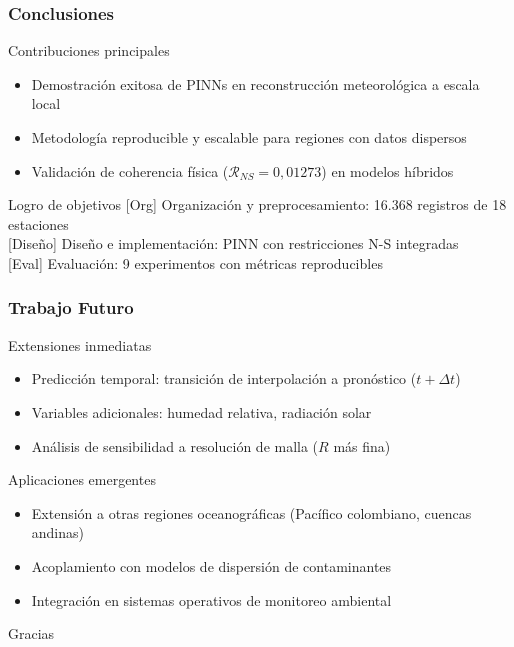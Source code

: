 \begin{frame}[fragile]
  \frametitle{Conclusiones}
  
  \begin{block}{Contribuciones principales}
    \begin{itemize}
      \item \textcolor{ColorVerdeOliva}{Demostración exitosa de PINNs} en reconstrucción meteorológica a escala local
      \item \textcolor{ColorVerdeOliva}{Metodología reproducible y escalable} para regiones con datos dispersos
      \item \textcolor{ColorVerdeOliva}{Validación de coherencia física} ($\mathcal{R}_{NS} = 0,01273$) en modelos híbridos
    \end{itemize}
  \end{block}
  
  \begin{block}{Logro de objetivos}
    \textcolor{ColorVerdeOliva}{[Org]} Organización y preprocesamiento: 16.368 registros de 18 estaciones\\
    \textcolor{ColorVerdeOliva}{[Diseño]} Diseño e implementación: PINN con restricciones N-S integradas\\
    \textcolor{ColorVerdeOliva}{[Eval]} Evaluación: 9 experimentos con métricas reproducibles
  \end{block}
  
\end{frame}

\begin{frame}[fragile]
  \frametitle{Trabajo Futuro}
  
  \begin{block}{Extensiones inmediatas}
    \begin{itemize}
      \item \textcolor{ColorMorado}{Predicción temporal}: transición de interpolación a pronóstico ($t + \Delta t$)
      \item \textcolor{ColorMorado}{Variables adicionales}: humedad relativa, radiación solar
      \item \textcolor{ColorMorado}{Análisis de sensibilidad} a resolución de malla ($R$ más fina)
    \end{itemize}
  \end{block}
  
  \begin{block}{Aplicaciones emergentes}
    \begin{itemize}
      \item \textcolor{ColorTurquesa}{Extensión a otras regiones} oceanográficas (Pacífico colombiano, cuencas andinas)
      \item \textcolor{ColorTurquesa}{Acoplamiento con modelos} de dispersión de contaminantes
      \item \textcolor{ColorTurquesa}{Integración en sistemas} operativos de monitoreo ambiental
    \end{itemize}
  \end{block}
  
\end{frame}

\begin{frame}[plain,c]
  \centering
  \huge{Gracias}
\end{frame}
